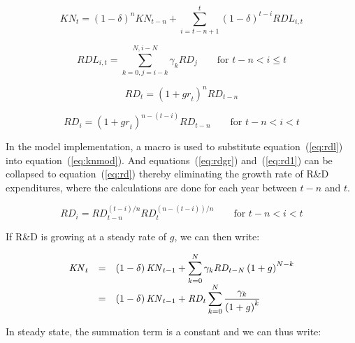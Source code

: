 \documentclass[11pt,letterpaper]{report}
\begin{document}
\begin{equation}
\label{eq:knmod}
\mathit{KN}_{t} = \left( 1 - \delta \right)^n \mathit{KN}_{t-n}
+ \sum_{i=t-n+1}^{t}{\left( 1 - \delta \right)^{t-i} \mathit{RDL}_{i,t}}
\end{equation}

\begin{equation}
\label{eq:rdl}
\mathit{RDL}_{i,t} = \sum_{k=0, j=i-k}^{N,i-N}{\gamma_k \mathit{RD}_j}
\qquad \textrm{for } t-n<i \le t
\end{equation}

\begin{equation}
\label{eq:rdgr}
\mathit{RD}_{t} = \left( 1 + \mathit{gr}_t \right)^{n}
\mathit{RD}_{t-n}
\end{equation}

\begin{equation}
\label{eq:rd1}
\mathit{RD}_{i} = \left( 1 + \mathit{gr}_t \right)^{n-(t-i)}
\mathit{RD}_{t-n} \qquad \textrm{for } t-n<i<t
\end{equation}

In the model implementation, a macro is used to substitute
equation~(\ref{eq:rdl}) into equation~(\ref{eq:knmod}).
And equations~(\ref{eq:rdgr}) and~(\ref{eq:rd1}) can be collapsed to equation~(\ref{eq:rd})
thereby eliminating the growth rate of R\&D expenditures, where
the calculations are done for each year between $t-n$ and $t$.

\begin{equation}
\label{eq:rd}
\mathit{RD}_{i} = \mathit{RD}_{t-n}^{(t-i)/n}
\mathit{RD}_{t}^{(n-(t-i))/n} \qquad \textrm{for } t-n<i<t
\end{equation}

If R\&D is growing at a steady rate of $g$, we can then write:

\begin{equation}
\label{eq:knss}
\begin{array} {l c l}
\mathit{KN}_{t} & = & \displaystyle \left(1-\delta \right) \mathit{KN}_{t-1}
+ \sum_{k=0}^N{\gamma_{k} \mathit{RD}_{t-N} \left(1+g\right)^{N-k}} \\
{}  & = & \displaystyle \left(1-\delta \right) \mathit{KN}_{t-1}
+ \mathit{RD}_{t} \sum_{k=0}^N{ \frac{\gamma_{k}}{\left(1+g\right)^k} } \\
\end{array}
\end{equation}

\noindent In steady state, the summation term is a constant and we can
thus write:
\end{document}
